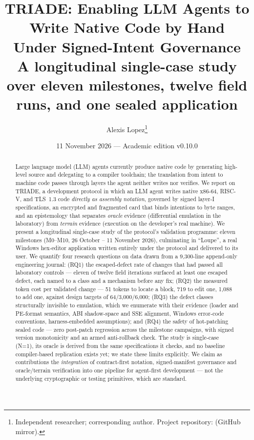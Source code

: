 \documentclass[11pt,a4paper]{article}
\title{\textbf{TRIADE: Enabling LLM Agents to Write Native Code by Hand\\
Under Signed-Intent Governance\\
\large A longitudinal single-case study over eleven milestones, twelve field
runs, and one sealed application}}
\author{Alexis Lopez\thanks{Independent researcher; corresponding author.
Project repository: \code{alexisfrlopez-debug/triade} (GitHub mirror).}}
\date{11 November 2026 — Academic edition v0.10.0}
\begin{document}
\maketitle
\thispagestyle{fancy}

\begin{abstract}
\noindent Large language model (LLM) agents currently produce native code by
generating high-level source and delegating to a compiler toolchain; the
translation from intent to machine code passes through layers the agent
neither writes nor verifies. We report on TRIADE, a development protocol in
which an LLM agent writes native x86-64, RISC-V, and TLS~1.3 code
\emph{directly as assembly notation}, governed by signed layer-I
specifications, an encrypted and fragmented card that binds intentions to
byte ranges, and an epistemology that separates \emph{oracle} evidence
(differential emulation in the laboratory) from \emph{terrain} evidence
(execution on the developer's real machine). We present a longitudinal
single-case study of the protocol's validation programme: eleven milestones
(M0--M10, 26 October -- 11 November 2026), culminating in ``Loupe'', a real
Windows hex-editor application written entirely under the protocol and
delivered to its user. We quantify four research questions on data drawn
from a 9{,}300-line append-only engineering journal: (RQ1) the
escaped-defect rate of changes that had passed all laboratory controls ---
eleven of twelve field iterations surfaced at least one escaped defect,
each named to a class and a mechanism before any fix; (RQ2) the measured
token cost per validated change --- 51 tokens to locate a block, 719 to
edit one, 1{,}088 to add one, against design targets of 64/3{,}000/6{,}000;
(RQ3) the defect classes structurally invisible to emulation, which we
enumerate with their evidence (loader and PE-format semantics, ABI
shadow-space and SSE alignment, Windows error-code conventions,
harness-embedded assumptions); and (RQ4) the safety of hot-patching sealed
code --- zero post-patch regression across the milestone campaigns, with
signed version monotonicity and an armed anti-rollback check. The study is
single-case (N=1), its oracle is derived from the same specifications it
checks, and no baseline compiler-based replication exists yet; we state
these limits explicitly. We claim as contributions the \emph{integration}
of contract-first notation, signed-manifest governance and oracle/terrain
verification into one pipeline for agent-first development --- not the
underlying cryptographic or testing primitives, which are standard.
\end{abstract}
\end{document}

